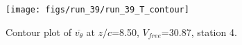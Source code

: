 \begin{figure}[H]
\centering
\texttt{[image: figs/run\_39/run\_39\_T\_contour]}
\caption{Contour plot of $\overline{v_{\theta}}$ at $z/c$=8.50, $V_{free}$=30.87, station 4.}
\label{fig:run_39_T_contour}
\end{figure}


